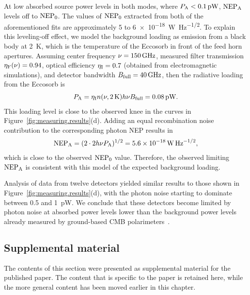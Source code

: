 At low absorbed source power levels in both modes, where $P_{\mathrm{A}} < \SI{0.1}{pW}$, $\mathrm{NEP}_{\mathrm{A}}$ levels off to $\mathrm{NEP}_0$.
The values of $\mathrm{NEP}_0$ extracted from both of the aforementioned fits are approximately 5 to \SI{6e-18}{W.Hz^{-1/2}}.
To explain this leveling-off effect, we model the background loading as emission from a black body at \SI{2}{K}, which is the temperature of the Eccosorb in front of the feed horn apertures.
Assuming center frequency $\nu = \SI{150}{GHz}$, measured filter transmission $\eta_\mathrm{F}(\nu) = 0.94$, optical efficiency $\eta_{\mathrm{I}} = 0.7$ (obtained from electromagnetic simulations), and detector bandwidth $B_\mathrm{full} = \SI{40}{GHz}$, then the radiative loading from the Eccosorb is 
\begin{equation*}
P_{\mathrm{A}}
  =
  \eta_{\mathrm{I}} n(\nu, \SI{2}{K}) h \nu B_\mathrm{full} = \SI{0.08}{pW}.
\end{equation*}
This loading level is close to the observed knee in the curves in Figure~\ref{fig:measuring.results}(d).
Adding an equal recombination noise contribution to the corresponding photon NEP results in
\begin{equation}
\mathrm{NEP}_{\mathrm{A}} = (2 \cdot 2 h \nu P_{\mathrm{A}})^{1/2} = \SI{5.6e-18}{W.Hz^{-1/2}},
\end{equation}
which is close to the observed $\mathrm{NEP}_0$ value.
Therefore, the observed limiting $\mathrm{NEP}_{\mathrm{A}}$ is consistent with this model of the expected background loading.

Analysis of data from twelve detectors yielded similar results to those shown in Figure~\ref{fig:measuring.results}(d), with the photon noise starting to dominate between 0.5 and \SI{1}{pW}.
We conclude that these detectors become limited by photon noise at absorbed power levels lower than the background power levels already measured by ground-based CMB polarimeters~\autocite{BICEP2II2014ApJ}.


\subsection{Supplemental material}
\label{sec:sensitivity.measuring.supplemental_material}

The contents of this section were presented as supplemental material for the published paper.
The content that is specific to the paper is retained here, while the more general content has been moved earlier in this chapter.

